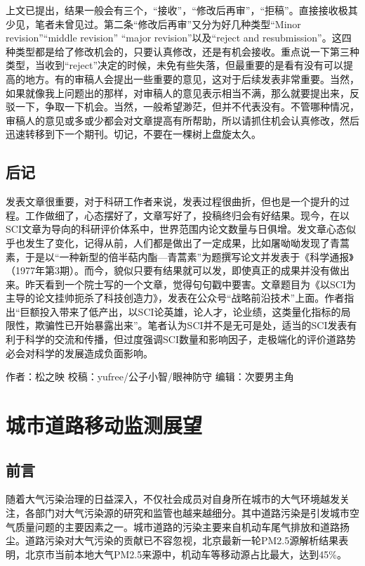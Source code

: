 \documentclass[]{book}
\begin{document}
上文已提出，结果一般会有三个，``接收''，``修改后再审''，``拒稿''。直接接收极其少见，笔者未曾见过。第二条``修改后再审''又分为好几种类型``Minor
revision''``middle revision'' ``major revision''以及``reject and
resubmission''。这四种类型都是给了修改机会的，只要认真修改，还是有机会接收。重点说一下第三种类型，当收到``reject''决定的时候，未免有些失落，但最重要的是看有没有可以提高的地方。有的审稿人会提出一些重要的意见，这对于后续发表非常重要。当然，如果就像我上问题出的那样，对审稿人的意见表示相当不满，那么就要提出来，反驳一下，争取一下机会。当然，一般希望渺茫，但并不代表没有。不管哪种情况，审稿人的意见或多或少都会对文章提高有所帮助，所以请抓住机会认真修改，然后迅速转移到下一个期刊。切记，不要在一棵树上盘旋太久。

\subsection{后记}\label{-1}

发表文章很重要，对于科研工作者来说，发表过程很曲折，但也是一个提升的过程。工作做细了，心态摆好了，文章写好了，投稿终归会有好结果。现今，在以SCI文章为导向的科研评价体系中，世界范围内论文数量与日俱增。发文章心态似乎也发生了变化，记得从前，人们都是做出了一定成果，比如屠呦呦发现了青蒿素，于是以``一种新型的倍半萜内酯---青蒿素''为题撰写论文并发表于《科学通报》（1977年第3期）。而今，貌似只要有结果就可以发，即使真正的成果并没有做出来。昨天看到一个院士写的一个文章，觉得句句戳中要害。文章题目为《以SCI为主导的论文挂帅扼杀了科技创造力》，发表在公众号``战略前沿技术''上面。作者指出``巨额投入带来了低产出，以SCI论英雄，论人才，论业绩，这类量化指标的局限性，欺骗性已开始暴露出来''。笔者认为SCI并不是无可是处，适当的SCI发表有利于科学的交流和传播，但过度强调SCI数量和影响因子，走极端化的评价道路势必会对科学的发展造成负面影响。

作者：松之映 校稿：yufree/公子小智/眼神防守 编辑：次要男主角

\section{城市道路移动监测展望}

\subsection{前言}\label{-4}

随着大气污染治理的日益深入，不仅社会成员对自身所在城市的大气环境越发关注，各部门对大气污染源的研究和监管也越来越细分。其中道路污染是引发城市空气质量问题的主要因素之一。城市道路的污染主要来自机动车尾气排放和道路扬尘。道路污染对大气污染的贡献已不容忽视，北京最新一轮PM2.5源解析结果表明，北京市当前本地大气PM2.5来源中，机动车等移动源占比最大，达到45\%。
\end{document}
